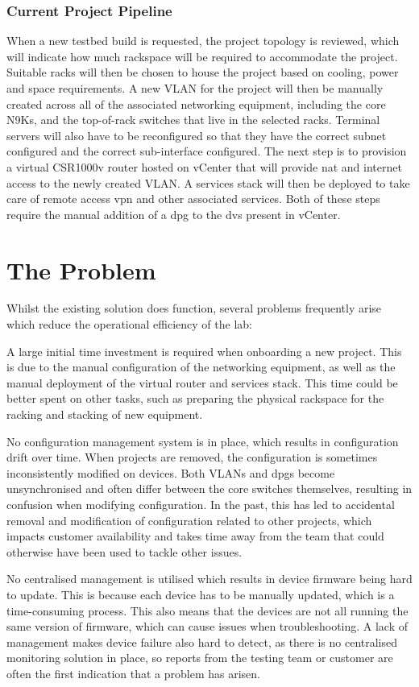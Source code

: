 \subsubsection{Current Project Pipeline}
When a new testbed build is
requested, the project topology is reviewed, which will indicate how much
rackspace will be required to accommodate the project. Suitable racks will then
be chosen to house the project based on cooling, power and space requirements.
A new VLAN for the project will then be manually created across all of the
associated networking equipment, including the core N9Ks, and the top-of-rack
switches that live in the selected racks. Terminal servers will also have to be
reconfigured so that they have the correct subnet configured and the correct
sub-interface configured. The next step is to provision a virtual CSR1000v
router hosted on vCenter that will provide \gls{nat} and internet access to the
newly created VLAN. A services stack will then be deployed to take care of
remote access \gls{vpn} and other associated services. Both of these steps
require the manual addition of a \gls{dpg} to the \gls{dvs} present in vCenter.
\section{The Problem}
\label{intro:problem}
Whilst the existing solution does
function, several problems frequently arise which reduce the operational
efficiency of the lab:

A large initial time investment is required when
onboarding a new project. This is due to the manual configuration of the
networking equipment, as well as the manual deployment of the virtual router
and services stack. This time could be better spent on other tasks, such as
preparing the physical rackspace for the racking and stacking of new equipment.

No configuration management system is in place, which results in configuration
drift over time. When projects are removed, the configuration is sometimes
inconsistently modified on devices. Both VLANs and \gls{dpg}s become
unsynchronised and often differ between the core switches themselves, resulting
in confusion when modifying configuration. In the past, this has led to
accidental removal and modification of configuration related to other projects,
which impacts customer availability and takes time away from the team that
could otherwise have been used to tackle other issues.

No centralised
management is utilised which results in device firmware being hard to update.
This is because each device has to be manually updated, which is a
time-consuming process. This also means that the devices are not all running
the same version of firmware, which can cause issues when troubleshooting. A
lack of management makes device failure also hard to detect, as there is no
centralised monitoring solution in place, so reports from the testing team or
customer are often the first indication that a problem has arisen.

